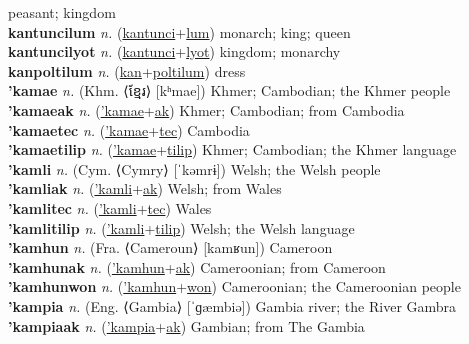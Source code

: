 peasant; kingdom \label{kantuncilon} \\
\textbf{kantuncilum} \textit{n.} (\hyperref[kantunci]{kantunci}+\hyperref[lum]{lum})
monarch; king; queen \label{kantuncilum} \\
\textbf{kantuncilyot} \textit{n.} (\hyperref[kantunci]{kantunci}+\hyperref[lyot]{lyot})
kingdom; monarchy \label{kantuncilyot} \\
\textbf{kanpoltilum} \textit{n.} (\hyperref[kan]{kan}+\hyperref[poltilum]{poltilum})
dress \label{kanpoltilum} \\
\textbf{'kamae} \textit{n.} (Khm. ⟨ខ្មែរ⟩ [kʰmae])
Khmer; Cambodian; the Khmer people \label{'kamae} \\
\textbf{'kamaeak} \textit{n.} (\hyperref['kamae]{'kamae}+\hyperref[ak]{ak})
Khmer; Cambodian; from Cambodia \label{'kamaeak} \\
\textbf{'kamaetec} \textit{n.} (\hyperref['kamae]{'kamae}+\hyperref[tec]{tec})
Cambodia \label{'kamaetec} \\
\textbf{'kamaetilip} \textit{n.} (\hyperref['kamae]{'kamae}+\hyperref[tilip]{tilip})
Khmer; Cambodian; the Khmer language \label{'kamaetilip} \\
\textbf{'kamli} \textit{n.} (Cym. ⟨Cymry⟩ [ˈkəmrɨ])
Welsh; the Welsh people \label{'kamli} \\
\textbf{'kamliak} \textit{n.} (\hyperref['kamli]{'kamli}+\hyperref[ak]{ak})
Welsh; from Wales \label{'kamliak} \\
\textbf{'kamlitec} \textit{n.} (\hyperref['kamli]{'kamli}+\hyperref[tec]{tec})
Wales \label{'kamlitec} \\
\textbf{'kamlitilip} \textit{n.} (\hyperref['kamli]{'kamli}+\hyperref[tilip]{tilip})
Welsh; the Welsh language \label{'kamlitilip} \\
\textbf{'kamhun} \textit{n.} (Fra. ⟨Cameroun⟩ [kamʁun])
Cameroon \label{'kamhun} \\
\textbf{'kamhunak} \textit{n.} (\hyperref['kamhun]{'kamhun}+\hyperref[ak]{ak})
Cameroonian; from Cameroon \label{'kamhunak} \\
\textbf{'kamhunwon} \textit{n.} (\hyperref['kamhun]{'kamhun}+\hyperref[won]{won})
Cameroonian; the Cameroonian people \label{'kamhunwon} \\
\textbf{'kampia} \textit{n.} (Eng. ⟨Gambia⟩ [ˈɡæmbiə])
Gambia river; the River Gambra \label{'kampia} \\
\textbf{'kampiaak} \textit{n.} (\hyperref['kampia]{'kampia}+\hyperref[ak]{ak})
Gambian; from The Gambia \label{'kampiaak} \\
